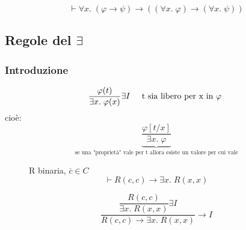 \documentclass{article}
\theoremstyle{break}
\theoremstyle{break}
\theoremstyle{break}
\theoremstyle{break}
\begin{document}
  \begin{figure}[H]
    \begin{exercise}
      \[
        \vdash \forall x.\; (\varphi \to \psi) \to ((\forall x.\; \varphi) \to (\forall x.\; \psi))
      \] 
      \begin{center}
        \large
      \end{center}
    \end{exercise}
    \end{figure}

\subsection{Regole del \( \exists  \)}
\subsubsection{Introduzione}
\[
\frac{\varphi(t)}{\exists x.\; \varphi(x)} \exists I \;\;\;\;\; \text{t sia libero per x in \( \varphi \) }
\] 
cioè:
\[
  \underbrace{\frac{\varphi[t/x]}{\exists x.\; \varphi}}_{\text{se una "proprietà" vale per t allora
  esiste un valore per cui vale}}
\] 

\begin{figure}[H]
  \begin{example}
    R binaria, \( \overline{c} \in C \) 
    \[
    \vdash R(c,c) \to \exists x.\; R(x,x)
    \] 

    \[
      \dfrac{\dfrac{R(c,c)}{\exists x.\; R(x,x)} \exists I}{R(c,c) \to \exists x.\; R(x,x)} \to I
    \] 
  \end{example}
  
\end{figure}
\end{document}

